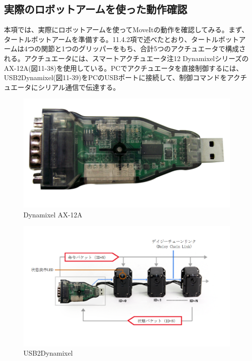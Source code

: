 \subsection{実際のロボットアームを使った動作確認}

本項では、実際にロボットアームを使ってMoveItの動作を確認してみる。まず、タートルボットアームを準備する。11.4.2項で述べたとおり、タートルボットアームは4つの関節と1つのグリッパーをもち、合計5つのアクチュエータで構成される。アクチュエータには、スマートアクチュエータ注12 DynamixelシリーズのAX-12A(図11-38)を使用している。PCでアクチュエータを直接制御するには、USB2Dynamixel(図11-39)をPCのUSBポートに接続して、制御コマンドをアクチュエータにシリアル通信で伝達する。

\begin{figure}[ht]
  \centering
  \includegraphics[width=\columnwidth]{pictures/chapter11/pic_11_38.png}
  \caption{Dynamixel AX-12A}
\end{figure}

\begin{figure}[ht]
  \centering
  \includegraphics[width=\columnwidth]{pictures/chapter11/pic_11_39.png}
  \caption{USB2Dynamixel}
\end{figure}

